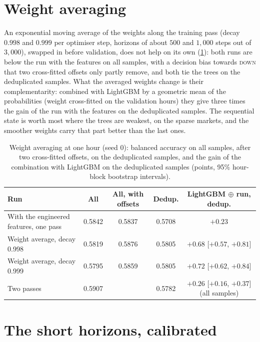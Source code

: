 \section{Weight averaging}
\label{app:results:ema}

An exponential moving average of the weights along the training pass (decay $0.998$ and
$0.999$ per optimiser step, horizons of about $500$ and $1{,}000$ steps out of $3{,}000$),
swapped in before validation, does not help on its own (\cref{tab:app:ema}): both runs are
below the run with the features on all samples, with a decision bias towards \textsc{down}
that two cross-fitted offsets only partly remove, and both tie the trees on the deduplicated
samples.  What the averaged weights change is their complementarity: combined with LightGBM
by a geometric mean of the probabilities (weight cross-fitted on the validation hours) they
give three times the gain of the run with the features on the deduplicated samples.  The
sequential state is worth most where the trees are weakest, on the sparse markets, and the
smoother weights carry that part better than the last ones.

\begin{table}[t]
\centering
\caption{Weight averaging at one hour (seed 0): balanced accuracy on all samples, after two
cross-fitted offsets, on the deduplicated samples, and the gain of the combination with
LightGBM on the deduplicated samples (points, 95\% hour-block bootstrap intervals).}
\label{tab:app:ema}
\small
\begin{fittable}\begin{tabular}{lcccc}
\toprule
Run & All & All, with offsets & Dedup. & LightGBM $\oplus$ run, dedup. \\
\midrule
With the engineered features, one pass & 0.5842 & 0.5837 & 0.5708 & $+0.23$ \\
Weight average, decay 0.998 & 0.5819 & 0.5876 & 0.5805 & $+0.68$ [$+0.57$, $+0.81$] \\
Weight average, decay 0.999 & 0.5795 & 0.5859 & 0.5805 & $+0.72$ [$+0.62$, $+0.84$] \\
Two passes & 0.5907 & & 0.5782 & $+0.26$ [$+0.16$, $+0.37$] (all samples) \\
\bottomrule
\end{tabular}\end{fittable}
\end{table}

\section{The short horizons, calibrated}
\label{app:results:short}

